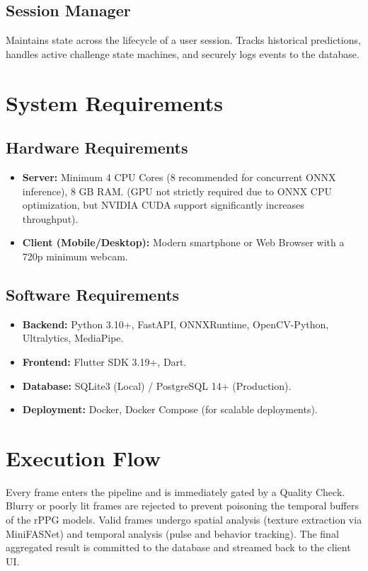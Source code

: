 \documentclass[12pt, a4paper]{report}
\begin{document}
\section{Session Manager}
Maintains state across the lifecycle of a user session. Tracks historical predictions, handles active challenge state machines, and securely logs events to the database.

\fi
\chapter{System Requirements}

\section{Hardware Requirements}
\begin{itemize}
    \item \textbf{Server:} Minimum 4 CPU Cores (8 recommended for concurrent ONNX inference), 8 GB RAM. (GPU not strictly required due to ONNX CPU optimization, but NVIDIA CUDA support significantly increases throughput).
    \item \textbf{Client (Mobile/Desktop):} Modern smartphone or Web Browser with a 720p minimum webcam.
\end{itemize}

\section{Software Requirements}
\begin{itemize}
    \item \textbf{Backend:} Python 3.10+, FastAPI, ONNXRuntime, OpenCV-Python, Ultralytics, MediaPipe.
    \item \textbf{Frontend:} Flutter SDK 3.19+, Dart.
    \item \textbf{Database:} SQLite3 (Local) / PostgreSQL 14+ (Production).
    \item \textbf{Deployment:} Docker, Docker Compose (for scalable deployments).
\end{itemize}



\iffalse
\chapter{Execution Flow}
Every frame enters the pipeline and is immediately gated by a Quality Check. Blurry or poorly lit frames are rejected to prevent poisoning the temporal buffers of the rPPG models. Valid frames undergo spatial analysis (texture extraction via MiniFASNet) and temporal analysis (pulse and behavior tracking). The final aggregated result is committed to the database and streamed back to the client UI.
\end{document}
